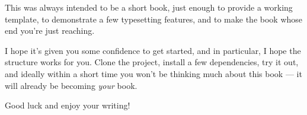 This was always intended to be a short book, just enough to provide a working template, to demonstrate
a few typesetting features, and to make the book whose end you're just reaching.

I hope it's given you some confidence to get started, and in particular, I hope the structure works for you.
Clone the project, install a few dependencies, try it out, and ideally within a short time you won't be thinking
much about this book --- it will already be becoming {\em your} book.

Good luck and enjoy your writing!

\vspace{2cm}





